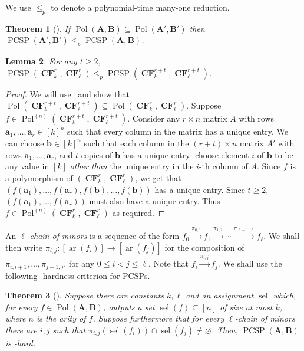 \documentclass[a4paper,11pt]{article}
\renewcommand{\vec}[1]{\ensuremath{\mathbf{#1}}}
\newcommand{\2}{\vec{2}}
\newcommand{\1}{\vec{1}}
\newcommand{\0}{\vec{0}}
\renewcommand{\A}{\ensuremath{\mathbf{A}}}
\newcommand{\B}{\ensuremath{\mathbf{B}}}
\DeclareMathOperator{\sel}{sel}
\DeclareMathOperator{\ar}{ar}
\DeclareMathOperator{\PCSP}{PCSP}
\DeclareMathOperator{\Pol}{Pol}
\DeclareMathOperator{\CF}{\mathbf{CF}}
\theoremstyle{plain}
\newtheorem{theorem}{Theorem}
\newtheorem{lemma}[theorem]{Lemma}
\theoremstyle{definition}
\begin{document}
We use $\leq_p$ to denote a polynomial-time many-one reduction.

\begin{theorem}[\cite{BG21:sicomp}]\label{polsubset}
If $\Pol(\A,\B) \subseteq \Pol(\A',\B')$ then $\PCSP(\A',\B')\leq_p\PCSP(\A,\B)$.
\end{theorem}
\begin{lemma}\label{lem:red}
    For any $t\geq 2$, $\PCSP(\CF_k^r, \CF_\ell^r)
    \leq_p \PCSP(\CF_k^{r + t}, \CF_\ell^{r + t})$.
\end{lemma}
\begin{proof}
We will use~ and show that $\Pol(\CF_k^{r + t}, \CF_\ell^{r + t}) \subseteq \Pol(\CF_k^r, \CF_\ell^r)$. Suppose $f \in \Pol^{(n)}(\CF_k^{r + t}, \CF_\ell^{r + t})$. Consider any $r \times n$ matrix $A$ with rows $\vec{a}_1,\ldots,\vec{a}_r \in [k]^n$ such that every column in the matrix has a unique entry. We can choose $\vec{b} \in [k]^n$ such that each column in the $(r + t) \times n$ matrix $A'$ with rows $\vec{a}_1,\ldots,\vec{a}_r$, and $t$ copies of $\vec{b}$ has a unique entry: choose element $i$ of $\vec{b}$ to be any value in $[k]$ \emph{other than} the unique entry in the $i$-th column of $A$.
Since $f$ is a polymorphism of $(\CF_k^r,\CF_\ell^r)$, we get that $(f(\vec{a}_1),\ldots,f(\vec{a}_r),f(\vec{b}),\ldots,f(\vec{b}))$ has a unique entry. Since $t\geq 2$, $(f(\vec{a}_1),\ldots,f(\vec{a}_r))$ must also have a unique entry. Thus $f \in \Pol^{(n)}(\CF_k^{r}, \CF_\ell^{r})$ as required.
\end{proof}

An \emph{$\ell$-chain of minors} is a sequence of the form $f_0 \xrightarrow{\pi_{0,1}} f_1 \xrightarrow{\pi_{1,2}} \cdots \xrightarrow{\pi_{\ell-1,\ell}} f_\ell$. We shall then write $\pi_{i,j}: [\ar(f_i)]\to[\ar(f_j)]$ for the composition of $\pi_{i,i+1}, \dots, \pi_{j-1,j}$, for any $0\leq i < j\leq \ell$. Note that $f_i \xrightarrow{\pi_{i,j}} f_j$. 
We shall use the following \NP-hardness criterion for PCSPs. 
\begin{theorem}[\cite{BWZ21}]\label{thm:chain hardness}
    Suppose there are constants $k, \ell$ and an assignment
    $\sel$ which, for every $f \in \Pol(\A, \B)$, outputs a set $\sel(f) \subseteq [n]$ of size at most $k$, where $n$ is the arity of $f$.
    Suppose furthermore that for every $\ell$-chain of minors there are
    $i, j$ such that $\pi_{i, j}(\sel(f_i))
    \cap \sel(f_j) \neq \varnothing$. Then, 
    $\PCSP(\A,\B)$ is \NP-hard.
\end{theorem}
\end{document}
